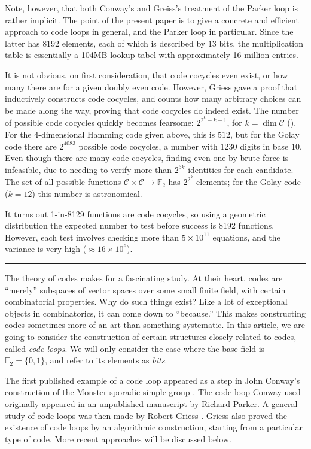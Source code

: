 \documentclass{article}
\theoremstyle{plain}
\theoremstyle{definition}
\def \cC {\mathcal{C}}
\def \FF {\mathbb{F}}
\begin{document}
Note, however, that both Conway's and Greiss's treatment of the Parker loop is rather implicit. The point of the present paper is to give a concrete and efficient approach to code loops in general, and the Parker loop in particular. Since the latter has $8192$ elements, each of which is described by $13$ bits, the multiplication table is essentially a 104MB lookup tabel with approximately 16 million entries.




It is not obvious, on first consideration, that code cocycles even exist, or how many there are for a given doubly even code. 
However, Griess gave a proof that inductively constructs code cocycles, and counts how many arbitrary choices can be made along the way, proving that code cocycles do indeed exist.
The number of possible code cocycles quickly becomes fearsome: $2^{2^k-k-1}$, for $k=\dim \cC$ (\cite[Theorem 10]{Griess}).
For the $4$-dimensional Hamming code given above, this is $512$, but for the Golay code there are $2^{4083}$ possible code cocycles, a number with $1230$ digits in base $10$.
Even though there are many code cocycles, finding even one by brute force is infeasible, due to needing to verify more than $2^{3k}$ identities for each candidate.
The set of all possible functions $\cC\times \cC \to \FF_2$ has $2^{2^k}$ elements; for the Golay code ($k=12$) this number is astronomical.

It turns out 1-in-8129 functions are code cocycles, so using a geometric distribution the expected number to test before success is 8192 functions. However, each test involves checking more than $5\times 10^{11}$ equations, and the variance is very high ($\approx 16\times 10^6$).




\medskip
\hrule
\medskip

The theory of codes makes for a fascinating study. 
At their heart, codes are ``merely'' subspaces of vector spaces over some small finite field, with certain combinatorial properties.
Why do such things exist? Like a lot of exceptional objects in combinatorics, it can come down to ``because.''
This makes constructing codes sometimes more of an art than something systematic.
In this article, we are going to consider the construction of certain structures closely related to codes, called \emph{code loops}. 
We will only consider the case where the base field is $\FF_2=\{0,1\}$, and refer to its elements as \emph{bits}.

The first published example of a code loop appeared as a step in John Conway's construction of the Monster sporadic simple group \cite{Conway}. 
The code loop Conway used originally appeared in an unpublished manuscript by Richard Parker.
A general study of code loops was then made by Robert Griess \cite{Griess}.
Griess also proved the existence of code loops by an algorithmic construction, starting from a particular type of code.
More recent approaches will be discussed below.
\end{document}
